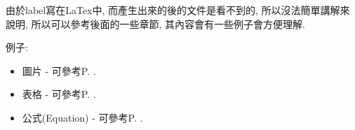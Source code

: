   \EmptyLine
由於label寫在LaTex中, 而產生出來的後的文件是看不到的, 所以沒法簡單講解來說明, 所以可以參考後面的一些章節, 其內容會有一些例子會方便理解.

例子:
\begin{itemize}
  \item 圖片 - 可參考P. .

  \item 表格 - 可參考P. .

  \item 公式(Equation) - 可參考P. .
\end{itemize}

